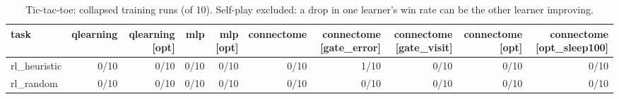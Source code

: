 \begin{table}[t]
\centering
\small
\begin{tabular}{lrrrrrrrrr}
\toprule
task & qlearning & qlearning [opt] & mlp & mlp [opt] & connectome & connectome [gate\_error] & connectome [gate\_visit] & connectome [opt] & connectome [opt\_sleep100] \\
\midrule
rl\_heuristic & 0/10 & 0/10 & 0/10 & 0/10 & 0/10 & 1/10 & 0/10 & 0/10 & 0/10 \\
rl\_random & 0/10 & 0/10 & 0/10 & 0/10 & 0/10 & 0/10 & 0/10 & 0/10 & 0/10 \\
\bottomrule
\end{tabular}
\caption{Tic-tac-toe: collapsed training runs (of 10). Self-play excluded: a drop in one learner's win rate can be the other learner improving.}
\label{tab:tictactoe_collapse}
\end{table}